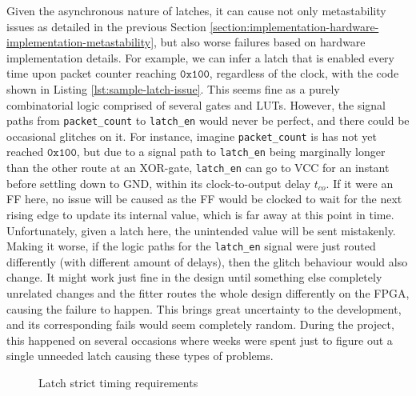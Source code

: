 \documentclass[a4paper]{report}
\newcommand{\code}{\texttt}
\begin{document}
Given the asynchronous nature of latches, it can cause not only metastability issues as detailed in the previous Section \ref{section:implementation-hardware-implementation-metastability}, but also worse failures based on hardware implementation details. For example, we can infer a latch that is enabled every time upon packet counter reaching $\mathtt{0x100}$, regardless of the clock, with the code shown in Listing \ref{lst:sample-latch-issue}. This seems fine as a purely combinatorial logic comprised of several gates and LUTs. However, the signal paths from \code{packet\_count} to \code{latch\_en} would never be perfect, and there could be occasional glitches on it. For instance, imagine \code{packet\_count} is has not yet reached $\mathtt{0x100}$, but due to a signal path to \code{latch\_en} being marginally longer than the other route at an XOR-gate, \code{latch\_en} can go to VCC for an instant before settling down to GND, within its clock-to-output delay $t_{co}$. If it were an FF here, no issue will be caused as the FF would be clocked to wait for the next rising edge to update its internal value, which is far away at this point in time. Unfortunately, given a latch here, the unintended value will be sent mistakenly. Making it worse, if the logic paths for the \code{latch\_en} signal were just routed differently (with different amount of delays), then the glitch behaviour would also change. It might work just fine in the design until something else completely unrelated changes and the fitter routes the whole design differently on the FPGA, causing the failure to happen. This brings great uncertainty to the development, and its corresponding fails would seem completely random. During the project, this happened on several occasions where weeks were spent just to figure out a single unneeded latch causing these types of problems.

\begin{figure}[h!]
  \caption{Latch strict timing requirements \cite{jensen-2020}}
  \label{fig:latch-timing}
\end{figure}
\end{document}
